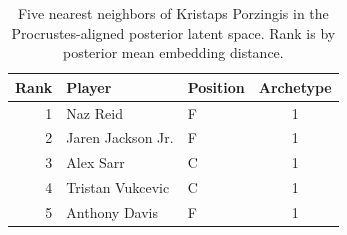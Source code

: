 \begin{table}[htbp]
  \centering\small
  \begin{tabular}{rllc}
    \toprule
    Rank & Player & Position & Archetype \\
    \midrule
    1 & Naz Reid & F & 1 \\
    2 & Jaren Jackson Jr. & F & 1 \\
    3 & Alex Sarr & C & 1 \\
    4 & Tristan Vukcevic & C & 1 \\
    5 & Anthony Davis & F & 1 \\
    \bottomrule
  \end{tabular}
  \caption{Five nearest neighbors of Kristaps Porzingis in the Procrustes-aligned posterior latent space. Rank is by posterior mean embedding distance.}
  \label{tab:Kristaps_Porzingis_neighbors}
\end{table}

